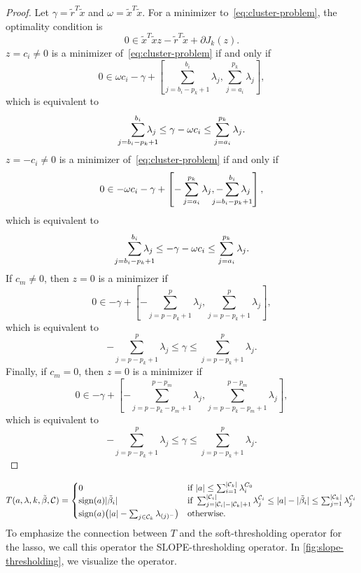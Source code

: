 \begin{proof}
  Let \(\gamma = \tilde{r}^T\tilde{x}\) and \(\omega = \tilde{x}^T\tilde{x}\).
  For a minimizer to~\eqref{eq:cluster-problem}, the optimality condition is
  \[
    0 \in \tilde{x}^T\tilde{x} z - \tilde{r}^T \tilde{x} + \partial J_k(z).
  \]
  \(z = c_i \neq 0\) is a minimizer of~\eqref{eq:cluster-problem} if and only if
  \[
    0 \in \omega c_i - \gamma + 
      \left[\sum_{j = b_i - p_k + 1}^{b_i} \lambda_j, \sum_{j=a_i}^{p_k}\lambda_j \right],
  \]
  which is equivalent to
  \[
    \smashoperator[r]{\sum_{j = b_i - p_k + 1}^{b_i}} \lambda_j \leq \gamma - \omega c_i \leq \sum_{j = a_i}^{p_k} \lambda_j.
  \]
  \(z = -c_i \neq 0\) is a minimizer of~\eqref{eq:cluster-problem} if and only if
  \[
    0 \in -\omega c_i - \gamma + 
  \left[-\sum_{j=a_i}^{p_k}\lambda_j, -\smashoperator{\sum_{j = b_i - p_k + 1}^{b_i}} \lambda_j\,\right],
  \]
  which is equivalent to
  \[
    \smashoperator[r]{\sum_{j = b_i - p_k + 1}^{b_i}} \lambda_j \leq -\gamma - \omega c_i \leq \sum_{j = a_i}^{p_k} \lambda_j.
  \]
  If \(c_m \neq 0\), then \(z = 0\) is a minimizer if
  \[
    0 \in -\gamma + 
      \left[-\sum_{j = p - p_k + 1}^{p} \lambda_j, \sum_{j=p - p_k + 1}^{p}\lambda_j \right],
  \]
  which is equivalent to
  \[
    -\sum_{j = p - p_k + 1}^{p} \lambda_j \leq \gamma \leq \sum_{j = p - p_k + 1}^{p} \lambda_j.
  \]
  Finally, if \(c_m = 0\), then \(z = 0\) is a minimizer if
  \[
    0 \in -\gamma + 
      \left[
        -\sum_{j = p - p_k - p_m + 1}^{p - p_m} \lambda_j,
      \sum_{j=p - p_k - p_m + 1}^{p - p_m}\lambda_j
      \right],
  \]
  which is equivalent to
  \[
    -\sum_{j = p - p_k + 1}^{p} \lambda_j \leq \gamma \leq \sum_{j = p - p_k + 1}^{p} \lambda_j.
  \]


\end{proof}

\begin{equation}
  \label{eq:slope-thresholding}
  T(a, \lambda,k,\tilde \beta, \mathcal{C}) =
  \begin{cases}
    0                                                                 & \text{if } |a| \leq \sum_{i=1}^{|\mathcal{C}_k|}\lambda^{C_0}_i                                                                                                                               \\
    \operatorname{sign}(a)|\tilde \beta_i|                                          & \text{if } \sum_{j= |\mathcal{C}_i| - |\mathcal{C}_k| + 1}^{|\mathcal{C}_i|} \lambda^{\mathcal{C}_i}_j \leq |a| - |\tilde \beta_i| \leq \sum_{j=1}^{|\mathcal{C}_k|}\lambda^{\mathcal{C}_i}_j \\
    \operatorname{sign}(a)\big(|a| - \sum_{j \in \mathcal{C}_k}\lambda_{(j)^-}\big) & \text{otherwise.
    }
  \end{cases}
\end{equation}
To emphasize the connection between \(T\) and the soft-thresholding operator
for the lasso, we call this operator the SLOPE-thresholding operator.
In \cref{fig:slope-thresholding}, we visualize the operator.

